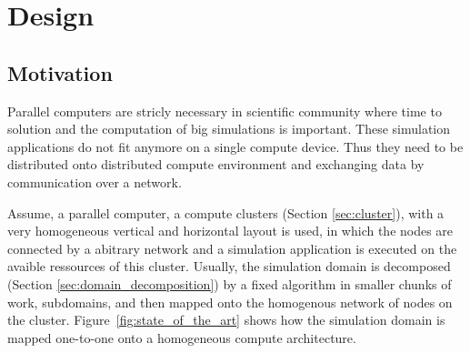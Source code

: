 \chapter{Design}
\label{sec:design}



\section{Motivation}

  Parallel computers are stricly necessary in scientific community
  where time to solution and the computation of big simulations
  is important. These simulation applications do not fit anymore
  on a single compute device. Thus they need to be distributed
  onto distributed compute environment and exchanging data by
  communication over a network.

  Assume, a parallel computer, a compute clusters (Section
  \ref{sec:cluster}), with a very homogeneous vertical and horizontal
  layout is used, in which the nodes are connected by a abitrary
  network and a simulation application is executed on the avaible
  ressources of this cluster. Usually, the simulation domain is
  decomposed (Section \ref{sec:domain_decomposition}) by a fixed
  algorithm in smaller chunks of work, subdomains, and then mapped
  onto the homogenous network of nodes on the
  cluster. Figure~\ref{fig:state_of_the_art} shows how the simulation
  domain is mapped one-to-one onto a homogeneous compute architecture.

